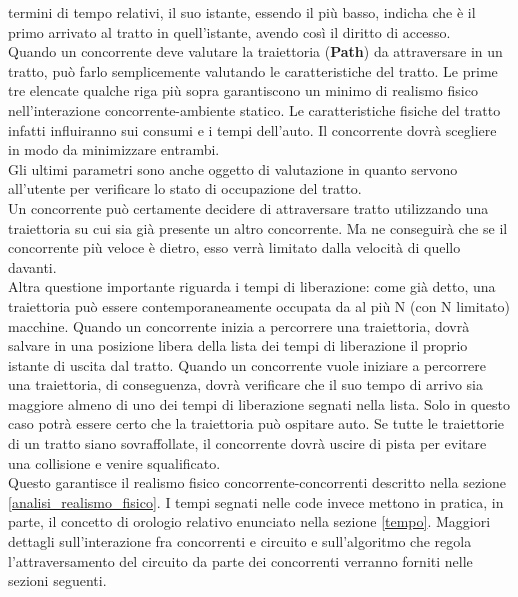 termini di tempo relativi, il suo istante, essendo il più basso, indicha che è
il primo arrivato al tratto in quell'istante, avendo così
il diritto di accesso.\\
Quando un concorrente deve valutare la traiettoria (\textbf{Path}) da
attraversare in un tratto, può farlo semplicemente valutando le caratteristiche
del tratto. Le prime tre elencate qualche riga più sopra garantiscono un minimo
di realismo fisico nell'interazione concorrente-ambiente statico. Le caratteristiche fisiche del tratto infatti
influiranno sui consumi e i tempi dell'auto. Il concorrente dovrà scegliere in
modo da minimizzare entrambi.\\
Gli ultimi parametri sono anche oggetto di valutazione in quanto servono all'utente per
verificare lo stato di occupazione del tratto.\\
Un concorrente può certamente decidere di attraversare tratto utilizzando una traiettoria
su cui sia già presente un altro concorrente. Ma ne conseguirà che se il concorrente
più veloce è dietro, esso verrà limitato dalla velocità di quello davanti.\\
Altra questione importante riguarda i tempi di liberazione: come già detto, una
traiettoria può essere contemporaneamente occupata da al più N (con N limitato) macchine.
Quando un concorrente inizia a percorrere una traiettoria, dovrà salvare in una posizione
libera della lista dei tempi di liberazione il proprio istante di uscita dal tratto.
Quando un concorrente vuole iniziare a percorrere una traiettoria, di conseguenza, dovrà verificare
che il suo tempo di arrivo sia maggiore almeno di uno dei tempi di liberazione segnati
nella lista. Solo in questo caso potrà essere certo che la traiettoria può ospitare auto.
Se tutte le traiettorie di un tratto siano sovraffollate, il concorrente dovrà
uscire di pista per evitare una collisione e venire squalificato.\\
Questo garantisce il realismo fisico
concorrente-concorrenti descritto nella sezione \ref{analisi_realismo_fisico}.
I tempi segnati nelle code invece mettono in pratica, in parte, il concetto di
orologio relativo enunciato nella sezione \ref{tempo}.
Maggiori dettagli sull'interazione fra concorrenti e circuito e sull'algoritmo
che regola l'attraversamento del circuito da parte dei concorrenti
verranno forniti nelle sezioni seguenti.
